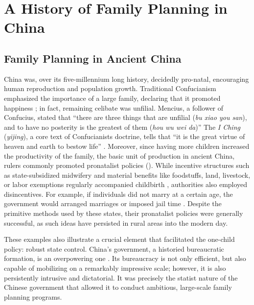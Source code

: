 \section{A History of Family Planning in China}
\subsection{Family Planning in Ancient China}

China was, over its five-millennium long history, decidedly pro-natal, encouraging human reproduction and population growth. Traditional Confucianism emphasized the importance of a large family, declaring that it promoted happiness \autocite[p. 935]{WangEtAl2016AJS}; in fact, remaining celibate was unfilial. Mencius, a follower of Confucius, stated that “there are three things that are unfilial (\emph{bu xiao you san}), and to have no posterity is the greatest of them (\emph{hou wu wei da})” \autocite{MenciusLeggeWikisource} The \emph{I Ching} (\emph{yijing}), a core text of Confucianists doctrine, tells that “it is the great virtue of heaven and earth to bestow life” \autocite{LiShuhua2012IChing}. Moreover, since having more children increased the productivity of the family, the basic unit of production in ancient China, rulers commonly promoted pronatalist policies (\cites[p.\ 15]{EntwisleHenderson2000}[p.\ 933]{WangEtAl2016AJS}{SJSUWatkinsCulturalRevolutionSite}). While incentive structures such as state-subsidized midwifery and material benefits like foodstuffs, land, livestock, or labor exemptions regularly accompanied childbirth \autocite[pp.\ 931--934]{WangEtAl2016AJS}, authorities also employed disincentives. For example, if individuals did not marry at a certain age, the government would arranged marriages or imposed jail time \autocite[p.\ 933]{WangEtAl2016AJS}. Despite the primitive methods used by these states, their pronatalist policies were generally successful, as such ideas have persisted in rural areas into the modern day.

These examples also illustrate a crucial element that facilitated the one-child policy: robust state control. China’s government, a historied bureaucratic formation, is an overpowering one \autocite[pp.\ 168--223]{Hui2005}. Its bureaucracy is not only efficient, but also capable of mobilizing on a remarkably impressive scale; however, it is also persistently intrusive and dictatorial. It was precisely the statist nature of the Chinese government that allowed it to conduct ambitious, large-scale family planning programs.

